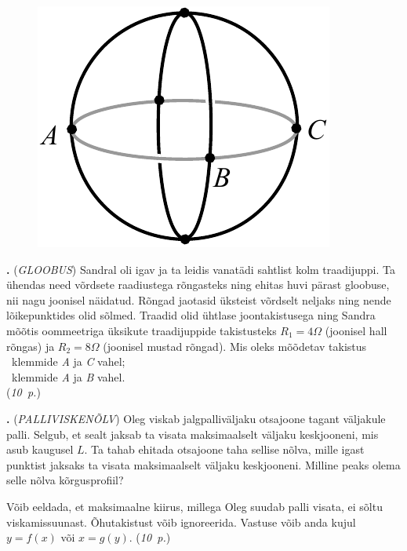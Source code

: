 \documentclass[11pt,a5paper]{article}
\newcommand{\numb}[1]{\vspace{5pt}\textbf{\large #1}}
\newcommand{\nimi}[1]{(\textsl{\small #1})}
\newcommand{\punktid}[1]{(\emph{#1~p.})}
\newcounter{ylesanne}
\newcommand{\yl}[1]{\addtocounter{ylesanne}{1}\numb{\theylesanne.} \nimi{#1} \newblock{}}
\begin{document}
\begin{figure}
  \vspace{-25pt}
  \begin{center}
  \includegraphics[scale=0.7]{Gloobus_joonis.pdf}
  \end{center}
  \vspace{-25pt}
\end{figure}
\yl{GLOOBUS}
Sandral oli igav ja ta leidis vanatädi sahtlist kolm traadijuppi.
Ta ühendas need võrdsete raadiustega rõngasteks ning ehitas  huvi pärast gloobuse,
nii nagu joonisel näidatud. Rõngad jaotasid üksteist võrdselt neljaks ning nende
lõikepunktides olid sõlmed. Traadid olid ühtlase joontakistusega ning Sandra mõõtis
oommeetriga üksikute traadijuppide takistusteks $R_1=\SI{4}\Omega$ (joonisel hall
rõngas) ja $R_2=\SI{8}\Omega$ (joonisel mustad rõngad). Mis oleks mõõdetav takistus \\
\osa~klemmide \emph{A} ja \emph{C} vahel;\\
\osa~klemmide \emph{A} ja \emph{B} vahel.\\
\punktid{10}

\yl{PALLIVISKENÕLV}
Oleg viskab jalgpalliväljaku otsajoone tagant väljakule palli. Selgub, et sealt
jaksab ta visata maksimaalselt väljaku keskjooneni, mis asub kaugusel $L$. Ta
tahab ehitada otsajoone taha sellise nõlva, mille igast punktist jaksaks ta visata
maksimaalselt väljaku keskjooneni. Milline peaks olema selle nõlva kõrgusprofiil?

Võib eeldada, et maksimaalne kiirus, millega Oleg suudab palli visata, ei sõltu
viskamissuunast. Õhutakistust võib ignoreerida. Vastuse võib anda kujul $y=f(x)$
või $x=g(y)$.
\punktid{10}

\newpage
\end{document}

